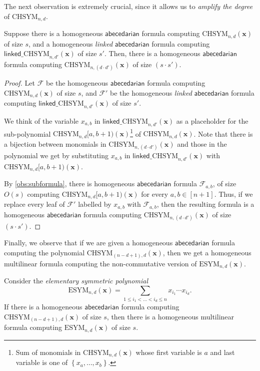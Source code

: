 \documentclass[10pt,a4paper]{article}
\def\set#1{\left\{ #1 \right\}}
\def\vecx{\mathbf{x}}
\newcommand{\form}{\textbf{$\mathcal{F}$}}
\newcommand{\abcd}{\mathsf{abecedarian}}
\newcommand{\esym}[2]{\mathrm{ESYM}_{#1,#2}}
\newcommand{\chsym}[2]{\mathrm{CHSYM}_{#1,#2}}
\newcommand{\lchsym}[2]{\mathrm{\mathsf{linked}\_CHSYM}_{#1,#2}}
\begin{document}
\noindent The next observation is extremely crucial, since it allows us to \emph{amplify the degree} of $\chsym{n}{d}$. 

\begin{observation}\label{obs:amplifyDeg}
	Suppose there is a homogeneous $\abcd$ formula computing $\chsym{n}{d}(\vecx)$ of size $s$, and a homogeneous \emph{linked} $\abcd$ formula computing $\lchsym{n}{d'}(\vecx)$ of size $s'$. Then, there is a homogeneous $\abcd$ formula computing $\chsym{n}{(d \cdot d')}(\vecx)$ of size $(s \cdot s')$.
\end{observation}

\begin{proof}
	Let $\form$ be the homogeneous $\abcd$ formula computing $\chsym{n}{d}(\vecx)$ of size $s$, and $\form'$ be the homogeneous \emph{linked} $\abcd$ formula computing $\lchsym{n}{d'}(\vecx)$ of size $s'$.

	We think of the variable $x_{a,b}$ in $\lchsym{n}{d'}(\vecx)$ as a placeholder for the sub-polynomial $\chsym{n}{d}[a, b+1)(\vecx)$\footnote{Sum of monomials in $\chsym{n}{d}(\vecx)$ whose first variable is $a$ and last variable is one of $\set{x_a, \ldots, x_b}$.} of $\chsym{n}{d}(\vecx)$.
	Note that there is a bijection between monomials in $\chsym{n}{(d \cdot d')}(\vecx)$ and those in the polynomial we get by substituting $x_{a,b}$ in $\lchsym{n}{d'}(\vecx)$ with $\chsym{n}{d}[a, b+1)(\vecx)$.

	By \autoref{obs:subformula}, there is homogeneous $\abcd$ formula $\form_{a,b}$, of size $O(s)$ computing $\chsym{n}{d}[a, b+1)(\vecx)$ for every $a, b \in [n+1]$.
	Thus, if we replace every leaf of $\form'$ labelled by $x_{a,b}$ with $\form_{a,b}$, then the resulting formula is a homogeneous $\abcd$ formula computing $\chsym{n}{(d\cdot d')}(\vecx)$ of size $(s \cdot s')$.
\end{proof}

Finally, we observe that if we are given a homogeneous $\abcd$ formula computing the polynomial $\chsym{(n-d+1)}{d}(\vecx)$, then we get a homogeneous multilinear formula computing the non-commutative version of $\esym{n}{d}(\vecx)$.

\begin{observation}\label{obs:chsymToEsym}
	Consider the \emph{elementary symmetric polynomial}
	\[
		\esym{n}{d}(\vecx) = \sum_{1 \leq i_1 < \ldots < i_d \leq n} x_{i_1} \cdots x_{i_d}.
	\]
	If there is a homogeneous $\abcd$ formula computing $\chsym{(n-d+1)}{d}(\vecx)$ of size $s$, then there is a homogeneous multilinear formula computing $\esym{n}{d}(\vecx)$ of size $s$.
\end{observation}
\end{document}
